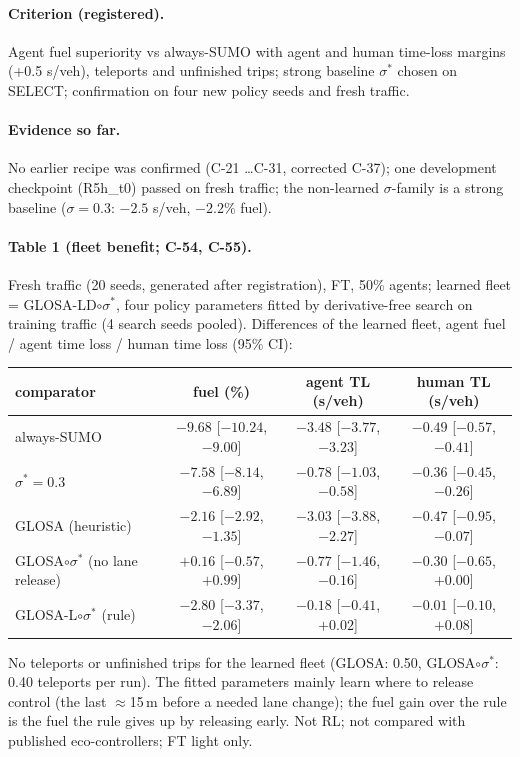 \documentclass[11pt]{article}
\begin{document}
\paragraph{Criterion (registered).} Agent fuel superiority vs always-SUMO with agent and human time-loss margins (+0.5 s/veh),
teleports and unfinished trips; strong baseline $\sigma^*$ chosen on SELECT; confirmation on four new policy seeds and fresh traffic.
\paragraph{Evidence so far.} No earlier recipe was confirmed (C-21 \dots C-31, corrected C-37); one development checkpoint (R5h\_t0)
passed on fresh traffic; the non-learned $\sigma$-family is a strong baseline ($\sigma=0.3$: $-2.5$ s/veh, $-2.2\%$ fuel).
\paragraph{Table 1 (fleet benefit; C-54, C-55).} Fresh traffic (20 seeds, generated after registration), FT, 50\% agents; learned
fleet = GLOSA-LD$\circ\sigma^*$, four policy parameters fitted by derivative-free search on training traffic (4 search seeds pooled).
Differences of the learned fleet, agent fuel / agent time loss / human time loss (95\% CI):
\begin{center}\small\begin{tabular}{lccc}\toprule
comparator & fuel (\%) & agent TL (s/veh) & human TL (s/veh)\\\midrule
always-SUMO & $-9.68$ [$-10.24$, $-9.00$] & $-3.48$ [$-3.77$, $-3.23$] & $-0.49$ [$-0.57$, $-0.41$]\\
$\sigma^*=0.3$ & $-7.58$ [$-8.14$, $-6.89$] & $-0.78$ [$-1.03$, $-0.58$] & $-0.36$ [$-0.45$, $-0.26$]\\
GLOSA (heuristic) & $-2.16$ [$-2.92$, $-1.35$] & $-3.03$ [$-3.88$, $-2.27$] & $-0.47$ [$-0.95$, $-0.07$]\\
GLOSA$\circ\sigma^*$ (no lane release) & $+0.16$ [$-0.57$, $+0.99$] & $-0.77$ [$-1.46$, $-0.16$] & $-0.30$ [$-0.65$, $+0.00$]\\
GLOSA-L$\circ\sigma^*$ (rule) & $-2.80$ [$-3.37$, $-2.06$] & $-0.18$ [$-0.41$, $+0.02$] & $-0.01$ [$-0.10$, $+0.08$]\\\bottomrule
\end{tabular}\end{center}
No teleports or unfinished trips for the learned fleet (GLOSA: 0.50, GLOSA$\circ\sigma^*$: 0.40 teleports per run). The fitted
parameters mainly learn where to release control (the last $\approx$15\,m before a needed lane change); the fuel gain over the rule is the
fuel the rule gives up by releasing early. Not RL; not compared with published eco-controllers; FT light only.
\end{document}
